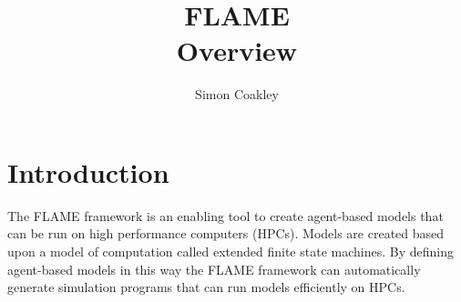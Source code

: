 \documentclass[12pt,a4paper]{article}
\begin{document}
\title{FLAME
\\Overview}
\author{Simon Coakley}

\maketitle



\begin{abstract}
\end{abstract}


\section{Introduction}

The FLAME framework is an enabling tool to create agent-based models that can
be run on high performance computers (HPCs). Models are created based upon a
model of computation called extended finite state machines. By defining
agent-based models in this way the FLAME framework can
automatically generate simulation programs that can run models efficiently on
HPCs.







%
%
\end{document}
